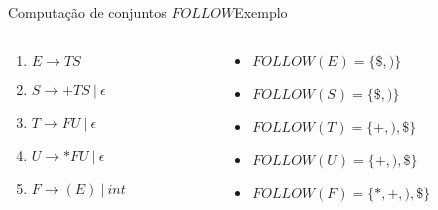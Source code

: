 \begin{frame}{Computação de conjuntos $FOLLOW$}{Exemplo}
    \begin{columns}
        \begin{column}{0.3\textwidth}
            \begin{enumerate}
              \item $E \rightarrow T S$

              \item $S \rightarrow + T S\ |\ \epsilon$

              \item $T \rightarrow F U\ |\ \epsilon$

              \item $U \rightarrow * F U\ |\ \epsilon$

              \item $F \rightarrow ( E )\ |\ int$
            \end{enumerate}
        \end{column}    
        \pause
        \begin{column}{0.7\textwidth}
            \begin{itemize}
                \item $FOLLOW(E) = \{\$, )\}$
                \item $FOLLOW(S) = \{\$, )\}$
		\item $FOLLOW(T) = \{+, ), \$ \}$
		\item $FOLLOW(U) = \{+, ), \$ \}$
                \item $FOLLOW(F) = \{*, +, ), \$\}$
            \end{itemize}
        \end{column}    
    \end{columns}
\end{frame}
